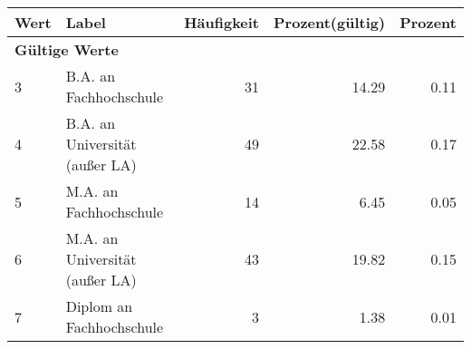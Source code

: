      \begin{longtable}{lXrrr}
     \toprule
     \textbf{Wert} & \textbf{Label} & \textbf{Häufigkeit} & \textbf{Prozent(gültig)} & \textbf{Prozent} \\
     \endhead
     \midrule
     \multicolumn{5}{l}{\textbf{Gültige Werte}}\\

     3 &
     \multicolumn{1}{X}{ B.A. an Fachhochschule   } &


       \num{31} &
       \num[round-mode=places,round-precision=2]{14,29} &
         \num[round-mode=places,round-precision=2]{0,11} \\

     4 &
     \multicolumn{1}{X}{ B.A. an Universität (außer LA)   } &


       \num{49} &
       \num[round-mode=places,round-precision=2]{22,58} &
         \num[round-mode=places,round-precision=2]{0,17} \\

     5 &
     \multicolumn{1}{X}{ M.A. an Fachhochschule   } &


       \num{14} &
       \num[round-mode=places,round-precision=2]{6,45} &
         \num[round-mode=places,round-precision=2]{0,05} \\

     6 &
     \multicolumn{1}{X}{ M.A. an Universität (außer LA)   } &


       \num{43} &
       \num[round-mode=places,round-precision=2]{19,82} &
         \num[round-mode=places,round-precision=2]{0,15} \\

     7 &
     \multicolumn{1}{X}{ Diplom an Fachhochschule   } &


       \num{3} &
       \num[round-mode=places,round-precision=2]{1,38} &
         \num[round-mode=places,round-precision=2]{0,01} \\


\end{longtable}
